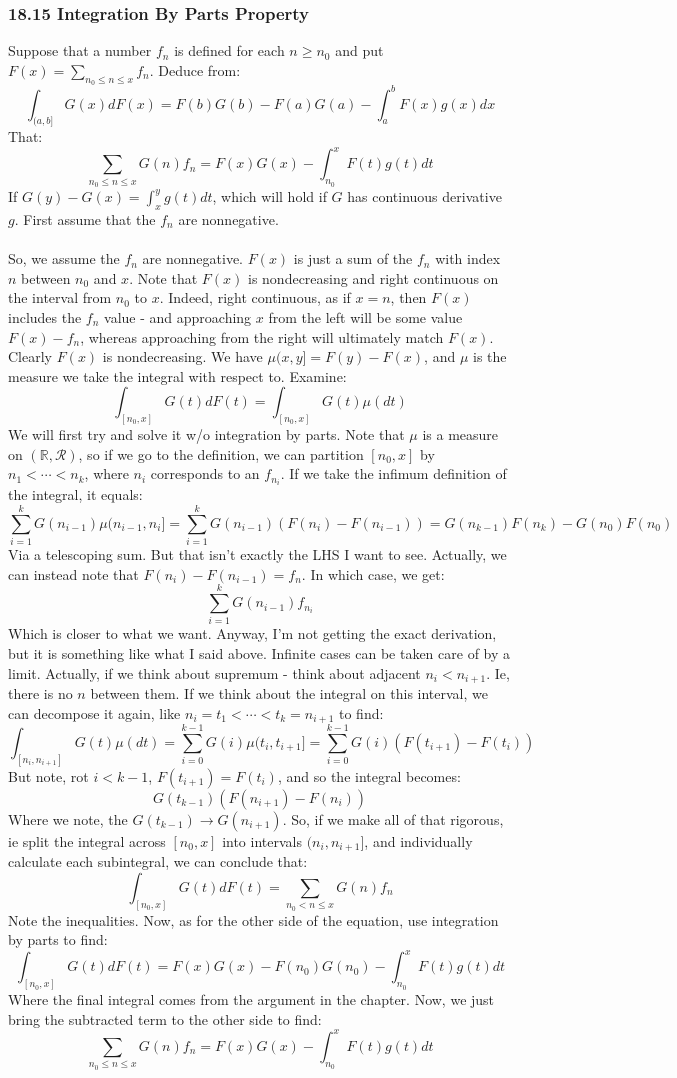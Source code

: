 \documentclass[12pt,a4paper]{article}
\newcommand{\1}[1]{\mathbbm{1}\left\{ #1 \right\}}
\newcommand{\R}{\mathbb{R}}
\newcommand{\rcal}{\mathcal{R}}
\begin{document}
\subsubsection{18.15 Integration By Parts Property} Suppose that a number $f_n$ is defined for each $n \geq n_0$ and put $F(x) = \sum_{n_0 \leq n \leq x} f_n$. Deduce from:
$$
	\int_{(a,b]} G(x)dF(x) =
	F(b)G(b) - F(a)G(a) - \int_a^b F(x) g(x) dx
$$
That:
$$
	\sum_{n_0 \leq n \leq x} G(n)f_n = F(x)G(x) -
	\int_{n_0}^x F(t)g(t) dt
$$
If $G(y) - G(x) = \int_x^y g(t) dt$, which will hold if $G$ has continuous derivative $g$. First assume that the $f_n$ are nonnegative.
\\\\
So, we assume the $f_n$ are nonnegative. $F(x)$ is just a sum of the $f_n$ with index $n$ between $n_0$ and $x$. Note that $F(x)$ is nondecreasing and right continuous on the interval from $n_0$ to $x$. Indeed, right continuous, as if $x = n$, then $F(x)$ includes the $f_n$ value - and approaching $x$ from the left will be some value $F(x) - f_n$, whereas approaching from the right will ultimately match $F(x)$. Clearly $F(x)$ is nondecreasing. We have $\mu(x,y] = F(y) - F(x)$, and $\mu$ is the measure we take the integral with respect to. Examine:
$$
	\int_{[n_0,x]} G(t)dF(t) =
	\int_{[n_0,x]} G(t) \mu(dt)
$$
We will first try and solve it w/o integration by parts. Note that $\mu$ is a measure on $(\R, \rcal)$, so if we go to the definition, we can partition $[n_0,x]$ by $n_1 < \cdots < n_k$, where $n_i$ corresponds to an $f_{n_i}$. If we take the infimum definition of the integral, it equals:
$$
	\sum_{i=1}^k G(n_{i-1})\mu(n_{i-1},n_i] =
	\sum_{i=1}^k G(n_{i-1})(F(n_i) - F(n_{i-1})) =
	G(n_{k-1})F(n_k) - G(n_0)F(n_0)
$$
Via a telescoping sum. But that isn't exactly the LHS I want to see. Actually, we can instead note that $F(n_i) - F(n_{i-1}) = f_n$. In which case, we get:
$$
	\sum_{i=1}^k G(n_{i-1})f_{n_i}
$$
Which is closer to what we want. Anyway, I'm not getting the exact derivation, but it is something like what I said above. Infinite cases can be taken care of by a limit. Actually, if we think about supremum - think about adjacent $n_i < n_{i+1}$. Ie, there is no $n$ between them. If we think about the integral on this interval, we can decompose it again, like $n_i = t_1 < \cdots < t_k = n_{i+1}$ to find:
$$
	\int_{[n_i,n_{i+1}]} G(t) \mu(dt) =
	\sum_{i=0}^{k-1} G(i)\mu(t_i, t_{i+1}] =
	\sum_{i=0}^{k-1} G(i)(F(t_{i+1}) - F(t_i))
$$
But note, rot $i < k-1$, $F(t_{i+1}) = F(t_i)$, and so the integral becomes:
$$
	G(t_{k-1})(F(n_{i+1})-F(n_i))
$$
Where we note, the $G(t_{k-1}) \to G(n_{i+1})$. So, if we make all of that rigorous, ie split the integral across $[n_0,x]$ into intervals $(n_i,n_{i+1}]$, and individually calculate each subintegral, we can conclude that:
$$
	\int_{[n_0,x]} G(t)dF(t) = \sum_{n_0 < n \leq x} G(n)f_n
$$
Note the inequalities. Now, as for the other side of the equation, use integration by parts to find:
$$
	\int_{[n_0,x]} G(t)dF(t) = F(x)G(x) - F(n_0)G(n_0) -
	\int_{n_0}^x F(t)g(t) dt
$$
Where the final integral comes from the argument in the chapter. Now, we just bring the subtracted term to the other side to find:
$$
	\sum_{n_0 \leq n \leq x} G(n)f_n = F(x)G(x) -
	\int_{n_0}^x F(t)g(t) dt
$$
\end{document}
